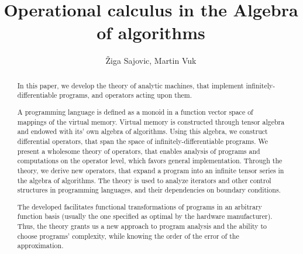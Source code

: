 \documentclass{article}
\title{Operational calculus in the Algebra of algorithms}
\author{Žiga Sajovic, Martin Vuk}
\begin{document}
\maketitle
\begin{abstract}
In this paper, we develop the theory of analytic machines, that implement infinitely-differentiable programs, and operators acting upon them.

A programming language is defined as a monoid in a function vector space of mappings of the virtual memory. Virtual memory is constructed through tensor algebra and endowed with its' own algebra of algorithms. Using this algebra, we construct differential operators, that span the space of infinitely-differentiable programs. We present a wholesome theory of operators, that enables analysis of programs and computations on the operator level, which favors general implementation. Through the theory, we derive new operators, that expand a program into an infinite tensor series in the algebra of algorithms. The theory is used to analyze iterators and other control structures in programming languages, and their dependencies on boundary conditions.

The developed facilitates functional transformations of programs in an arbitrary function basis (usually the one specified as optimal by the hardware manufacturer). Thus, the theory grants us a new approach to program analysis and the ability to choose programs' complexity, while knowing the order of the error of the approximation.
\end{abstract}
\end{document}
